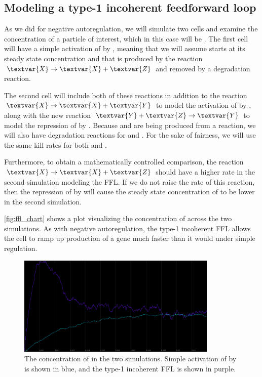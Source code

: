 \FloatBarrier
{}
\subsection{Modeling a type-1 incoherent feedforward loop}

As we did for negative autoregulation, we will simulate two cells and examine the concentration of a particle of interest, which in this case will be . The first cell will have a simple activation of  by , meaning that we will assume  starts at its steady state concentration and that  is produced by the reaction $\textvar{X} \rightarrow \textvar{X} + \textvar{Z}$ and removed by a degradation reaction.

The second cell will include both of these reactions in addition to the reaction $\textvar{X} \rightarrow \textvar{X} + \textvar{Y}$ to model the activation of  by , along with the new reaction $\textvar{Y} + \textvar{Z} \rightarrow \textvar{Y}$ to model the repression of  by . Because  and  are being produced from a reaction, we will also have degradation reactions for  and . For the sake of fairness, we will use the same kill rates for both  and .

Furthermore, to obtain a mathematically controlled comparison, the reaction $\textvar{X} \rightarrow \textvar{X} + \textvar{Z}$ should have a higher rate in the second simulation modeling the FFL. If we do not raise the rate of this reaction, then the repression of  by  will cause the steady state concentration of  to be lower in the second simulation.

\autoref{fig:ffl_chart} shows a plot visualizing the concentration of  across the two simulations. As with negative autoregulation, the type-1 incoherent FFL allows the cell to ramp up production of a gene  much faster than it would under simple regulation.\\

\begin{figure}[h]
\centering
\mySfFamily
\includegraphics[width = 0.85\textwidth]{../images/cellblender_ffl.png}
\caption{The concentration of  in the two simulations. Simple activation of  by  is shown in blue, and the type-1 incoherent FFL is shown in purple.}
\label{fig:ffl_chart}
\end{figure}

